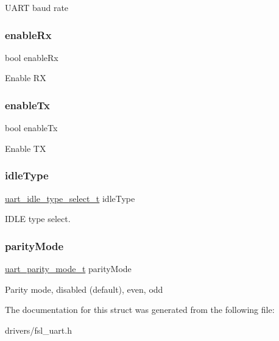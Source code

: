U\+A\+RT baud rate \mbox{\label{struct__uart__config_ac6fe4a8b966fb5611f77358b819671b2}} 
\subsubsection{\texorpdfstring{enableRx}{enableRx}}
{\footnotesize\ttfamily bool enable\+Rx}

Enable RX \mbox{\label{struct__uart__config_a221caf5c134ec8fcee82b8505ee75731}} 
\subsubsection{\texorpdfstring{enableTx}{enableTx}}
{\footnotesize\ttfamily bool enable\+Tx}

Enable TX \mbox{\label{struct__uart__config_a00678135fe612c2ced015e2a85420b7d}} 
\subsubsection{\texorpdfstring{idleType}{idleType}}
{\footnotesize\ttfamily \mbox{\hyperlink{group__uart__driver_ga9457d04cb0bf9c547babd63a4d20a9fa}{uart\+\_\+idle\+\_\+type\+\_\+select\+\_\+t}} idle\+Type}

I\+D\+LE type select. \mbox{\label{struct__uart__config_a316fd94f4c5e6d15a3cda133d5dd5683}} 
\subsubsection{\texorpdfstring{parityMode}{parityMode}}
{\footnotesize\ttfamily \mbox{\hyperlink{group__uart__driver_ga3d74bf70252b21a0dd19d61587ed320c}{uart\+\_\+parity\+\_\+mode\+\_\+t}} parity\+Mode}

Parity mode, disabled (default), even, odd 

The documentation for this struct was generated from the following file\+:\begin{DoxyCompactItemize}
\item 
drivers/fsl\+\_\+uart.\+h\end{DoxyCompactItemize}
